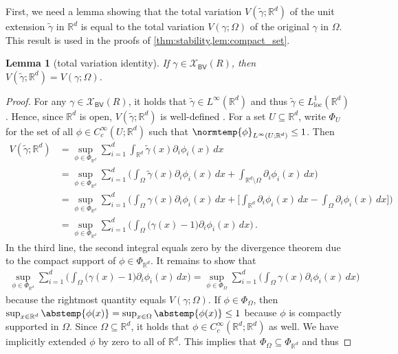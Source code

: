 \documentclass[pdflatex,sn-mathphys-num]{sn-jnl-preprint}
\newcommand{\R}{\mathbb{R}}
\newcommand{\cX}{\mathcal{X}}
\newcommand{\BV}{\mathsf{BV}}
\newcommand{\norm}{\normtemp}
\newcommand{\abs}{\abstemp}
\newcommand{\diff}{d}
\newcommand{\dd}[1]{\,\diff{#1}}
\theoremstyle{thmstyleone}%
\newtheorem{lemma}[theorem]{Lemma}%
\theoremstyle{thmstyletwo}%
\theoremstyle{thmstylethree}%
\numberwithin{equation}{section}
\numberwithin{theorem}{section}
\begin{document}
\begin{appendices}
First, we need a lemma showing that the total variation $V(\widetilde{\gamma};\R^d)$ of the unit extension $\widetilde{\gamma}$ in $\R^d$ is equal to the total variation $V(\gamma;\Omega)$ of the original $\gamma$ in $\Omega$. This result is used in the proofs of \cref{thm:stability,lem:compact_set}.
\begin{lemma}[total variation identity]\label{lem:tv_identity}
    If $\gamma\in\cX_{\BV}(R)$, then $V(\widetilde{\gamma};\R^d)=V(\gamma;\Omega)$.
\end{lemma}
\begin{proof}
    For any $\gamma\in\cX_{\BV}(R)$, it holds that $\widetilde{\gamma}\in L^\infty(\R^d)$ and thus $\widetilde{\gamma}\in L^1_{\mathrm{loc}}(\R^d)$. Hence, since $\R^d$ is open, $V(\widetilde{\gamma};\R^d)$ is well-defined \cite[Definition~14.2, p.~460]{leoni2017first}. For a set $U\subseteq\R^d$, write $\Phi_U$ for the set of all $\phi\in C_c^{\infty}(U;\R^d)$ such that $\norm{\phi}_{L^\infty(U;\R^d)}\leq 1$. Then
    \begin{align*}
        V(\widetilde{\gamma};\R^d) &=
        \sup_{\phi\in\Phi_{\R^d}} \sum_{i=1}^d\int_{\R^d}\widetilde{\gamma}(x)\partial_i\phi_i(x)\dd{x}\\
        &=
        \sup_{\phi\in\Phi_{\R^d}} \sum_{i=1}^d\biggl(\int_{\Omega}\widetilde{\gamma}(x)\partial_i\phi_i(x)\dd{x} + \int_{\R^d\setminus\Omega}\partial_i\phi_i(x)\dd{x}\biggr)\\
        &= \sup_{\phi\in\Phi_{\R^d}} \sum_{i=1}^d \biggl(\int_{\Omega} \gamma(x)\partial_i\phi_i(x)\dd{x} + \biggl[\int_{\R^d}\partial_i\phi_i(x)\dd{x} - \int_{\Omega}\partial_i\phi_i(x)\dd{x}\biggr]\biggr)\\
        &= \sup_{\phi\in\Phi_{\R^d}} \sum_{i=1}^d \biggl(\int_{\Omega} \bigl(\gamma(x)-1\bigr)\partial_i\phi_i(x)\dd{x}\biggr)\,.
    \end{align*}
    In the third line, the second integral equals zero by the divergence theorem due to the compact support of $\phi\in\Phi_{\R^d}$. It remains to show that
    \begin{align*}
        \sup_{\phi\in\Phi_{\R^d}} \sum_{i=1}^d \biggl(\int_{\Omega} \bigl(\gamma(x)-1\bigr)\partial_i\phi_i(x)\dd{x}\biggr) = \sup_{\phi\in\Phi_{\Omega}} \sum_{i=1}^d \biggl(\int_{\Omega} \gamma(x)\partial_i\phi_i(x)\dd{x}\biggr)
    \end{align*}
    because the rightmost quantity equals $V(\gamma;\Omega)$.    
    If $\phi\in \Phi_\Omega$, then $\sup_{x\in\R^d}\abs{\phi(x)}=\sup_{x\in\Omega}\abs{\phi(x)}\leq 1$ because $\phi$ is compactly supported in $\Omega$. Since $\Omega\subseteq\R^d$, it holds that $\phi\in C_c^\infty(\R^d;\R^d)$ as well. We have implicitly extended $\phi$ by zero to all of $\R^d$. This implies that $\Phi_\Omega\subseteq \Phi_{\R^d}$ and thus

\end{proof}
\end{appendices}
\end{document}
